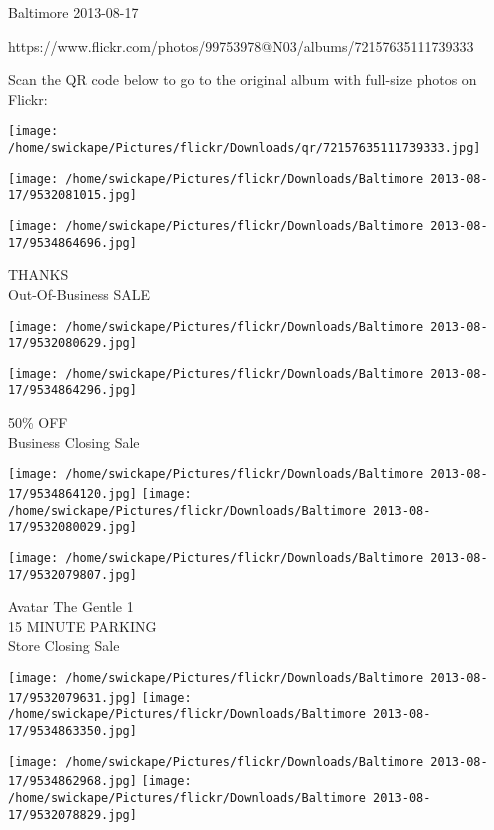 \documentclass[10pt,letterpaper]{article}
\begin{document}
Baltimore 2013-08-17

https://www.flickr.com/photos/99753978@N03/albums/72157635111739333

Scan the QR code below to go to the original album with full-size photos on Flickr:

\texttt{[image: /home/swickape/Pictures/flickr/Downloads/qr/72157635111739333.jpg]}
\pagebreak

\texttt{[image: /home/swickape/Pictures/flickr/Downloads/Baltimore 2013-08-17/9532081015.jpg]}

\vspace{0.25in}
\texttt{[image: /home/swickape/Pictures/flickr/Downloads/Baltimore 2013-08-17/9534864696.jpg]}

THANKS\\
Out{-}Of{-}Business SALE
\pagebreak

\texttt{[image: /home/swickape/Pictures/flickr/Downloads/Baltimore 2013-08-17/9532080629.jpg]}

\vspace{0.25in}
\texttt{[image: /home/swickape/Pictures/flickr/Downloads/Baltimore 2013-08-17/9534864296.jpg]}

50\% OFF\\
Business Closing Sale
\pagebreak

\texttt{[image: /home/swickape/Pictures/flickr/Downloads/Baltimore 2013-08-17/9534864120.jpg]}
\texttt{[image: /home/swickape/Pictures/flickr/Downloads/Baltimore 2013-08-17/9532080029.jpg]}

\vspace{0.25in}
\texttt{[image: /home/swickape/Pictures/flickr/Downloads/Baltimore 2013-08-17/9532079807.jpg]}

Avatar The Gentle 1\\
15 MINUTE PARKING\\
Store Closing Sale
\pagebreak

\texttt{[image: /home/swickape/Pictures/flickr/Downloads/Baltimore 2013-08-17/9532079631.jpg]}
\texttt{[image: /home/swickape/Pictures/flickr/Downloads/Baltimore 2013-08-17/9534863350.jpg]}

\texttt{[image: /home/swickape/Pictures/flickr/Downloads/Baltimore 2013-08-17/9534862968.jpg]}
\texttt{[image: /home/swickape/Pictures/flickr/Downloads/Baltimore 2013-08-17/9532078829.jpg]}
\end{document}
